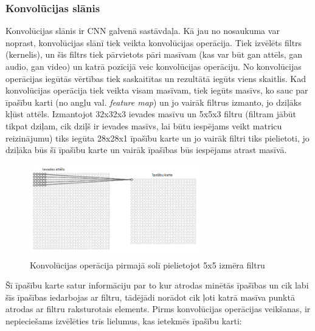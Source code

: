\subsubsection{Konvolūcijas slānis}
Konvolūcijas slānis ir CNN galvenā sastāvdaļa. Kā jau no nosaukuma var noprast, konvolūcijas slānī tiek veikta konvolūcijas operācija. Tiek izvēlēts filtrs (kernelis), un šis filtrs tiek pārvietots pāri masīvam (kas var būt gan attēls, gan audio, gan video) un katrā pozīcijā veic konvolūcijas operāciju. No konvolūcijas operācijas iegūtās vērtības tiek saskaitītas un rezultātā iegūts viens skaitlis. Kad konvolūcijas operācija tiek veikta visam masīvam, tiek iegūts masīvs, ko sauc par īpašību karti (no angļu val. \textit{feature map}) un jo vairāk filtrus izmanto, jo dziļāks kļūst attēls. Izmantojot 32x32x3 ievades masīvu un 5x5x3 filtru (filtram jābūt tikpat dziļam, cik dziļš ir ievades masīvs, lai būtu iespējams veikt matricu reizinājumu) tiks iegūta 28x28x1 īpašību karte un jo vairāk filtri tiks pielietoti, jo dziļāka būs šī īpašību karte un vairāk īpašības būs iespējams atrast masīvā. 
\begin{figure}[h]%
	\centering
	\includegraphics[height=4cm]{images/ActivationMap.png} %
	\caption{Konvolūcijas operācija pirmajā solī pielietojot 5x5 izmēra filtru}%
	\label{fig:example}%
\end{figure}

Šī īpašību karte satur informāciju par to kur atrodas minētās īpašības un cik labi šīs īpašības iedarbojas ar filtru, tādējādi norādot cik ļoti katrā masīva punktā atrodas ar filtru raksturotais elements. Pirms konvolūcijas operācijas veikšanas, ir nepieciešams izvēlēties trīs lielumus, kas ietekmēs īpašību karti:

